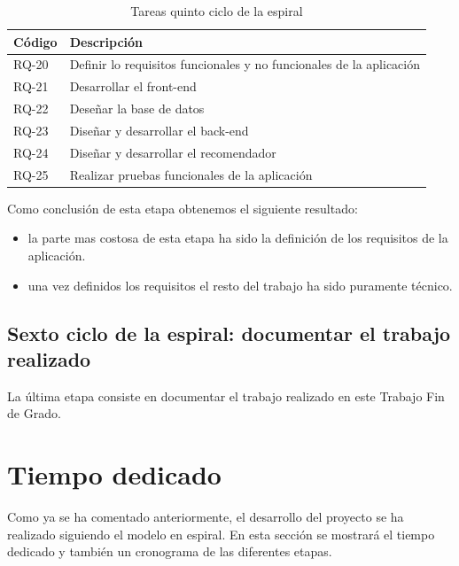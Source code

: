 \begin{table}[H]
\begin{center}
\begin{tabular}{|p{1.5cm}| p{10.5cm}|}
\hline 
Código & Descripción \\
\hline \hline
RQ-20 & Definir lo requisitos funcionales y no funcionales de la aplicación\\ \hline
RQ-21 & Desarrollar el front-end\\ \hline
RQ-22 & Deseñar la base de datos\\ \hline
RQ-23 & Diseñar y desarrollar el back-end\\ \hline
RQ-24 & Diseñar y desarrollar el recomendador\\ \hline
RQ-25 & Realizar pruebas funcionales de la aplicación\\ \hline
\end{tabular}
\caption{Tareas quinto ciclo de la espiral}
\label{tabla:requisitosEtapa5}
\end{center}
\end{table}

Como conclusión de esta etapa obtenemos el siguiente resultado:
\begin{itemize}
	\item la parte mas costosa de esta etapa ha sido la definición de los requisitos de la aplicación.
	\item una vez definidos los requisitos el resto del trabajo ha sido puramente técnico. 
\end{itemize}


\subsection{Sexto ciclo de la espiral: documentar el trabajo realizado}

La última etapa consiste en documentar el trabajo realizado en este Trabajo Fin de Grado.

\newpage

\section{Tiempo dedicado}

Como ya se ha comentado anteriormente, el desarrollo del proyecto se ha realizado siguiendo el modelo en espiral. En esta sección se mostrará el tiempo dedicado y también un cronograma de las diferentes etapas.

